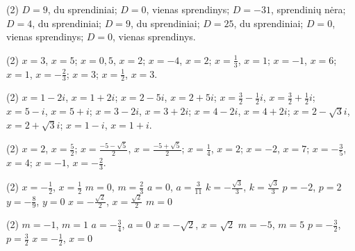 \documentclass[11pt,a4paper]{scrartcl}
\begin{document}
\newpage
\answerssection

\begin{problem} \phantom{text}
\begin{tasks}[label={(\arabic*)}, label-offset=0.9em](2)
    \task $D=9$, du sprendiniai;
    \task $D=0$, vienas sprendinys;
    \task $D=-31$, sprendinių nėra;
    \task $D=4$, du sprendiniai;
    \task $D=9$, du sprendiniai;
    \task $D=25$, du sprendiniai;
    \task $D=0$, vienas sprendinys;
    \task $D=0$, vienas sprendinys.
\end{tasks}
\end{problem}

\begin{problem} \phantom{text}
\begin{tasks}[label={(\arabic*)}, label-offset=0.9em](2)
    \task $x=3$, $x=5$;
    \task $x=0,5$, $x=2$;
    \task $x=-4$, $x=2$;
    \task $x=\frac{1}{3}$, $x=1$;
    \task $x=-1$, $x=6$;
    \task $x=1$, $x=-\frac{2}{3}$;
    \task $x=3$;
    \task $x=\frac{1}{2}$, $x=3$.
\end{tasks}
\end{problem}

\begin{problem} \phantom{text}
\begin{tasks}[label={(\arabic*)}, label-offset=0.9em](2)
    \task $x=1-2i$, $x=1+2i$;
    \task $x=2-5i$, $x=2+5i$;
    \task $x=\frac{3}{2}-\frac{1}{2}i$, $x=\frac{3}{2}+\frac{1}{2}i$;
    \task $x=5-i$, $x=5+i$;
    \task $x=3-2i$, $x=3+2i$;
    \task $x=4-2i$, $x=4+2i$;
    \task $x=2-\sqrt{3}i$, $x=2+\sqrt{3}i$;
    \task $x=1-i$, $x=1+i$.
\end{tasks}
\end{problem}

\begin{problem} \phantom{text}
\begin{tasks}[label={(\arabic*)}, label-offset=0.9em](2)
    \task $x=2$, $x=\frac{5}{2}$;
    \task $x=\frac{-5-\sqrt{5}}{2}$, $x=\frac{-5+\sqrt{5}}{2}$;
    \task $x=\frac{1}{4}$, $x=2$;
    \task $x=-2$, $x=7$;
    \task $x=-\frac{3}{5}$, $x=4$;
    \task $x=-1$, $x=-\frac{2}{3}$.
\end{tasks}
\end{problem}

\begin{problem} \phantom{text}
\begin{tasks}[resume, label={(\arabic*)}, label-offset=0.9em](2)
    \task $x=-\frac{1}{2}$, $x=\frac{1}{2}$
    \task $m=0$, $m=\frac{2}{3}$
    \task $a=0$, $a=\frac{3}{11}$
    \task $k=-\frac{\sqrt{3}}{3}$, $k=\frac{\sqrt{3}}{3}$
    \task $p=-2$, $p=2$
    \task $y=-\frac{8}{9}$, $y=0$
    \task $x=-\frac{\sqrt{2}}{2}$, $x=\frac{\sqrt{2}}{2}$
    \task $m=0$
\end{tasks}

\begin{tasks}[resume, label={(\arabic*)}, label-offset=0.9em](2)
    \task $m=-1$, $m=1$
    \task $a=-\frac{3}{4}$, $a=0$
    \task $x=-\sqrt{2}$, $x=\sqrt{2}$
    \task $m=-5$, $m=5$
    \task $p=-\frac{3}{2}$, $p=\frac{3}{2}$
    \task $x=-\frac{1}{2}$, $x=0$
\end{tasks}
\end{problem}
\end{document}
